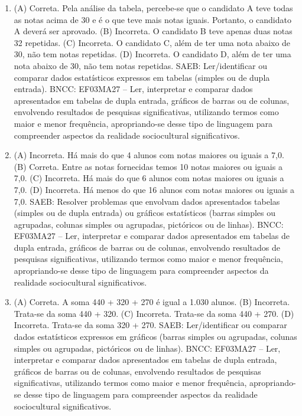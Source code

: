 \begin{enumerate}
\item
(A) Correta. Pela análise da tabela, percebe-se que o candidato A teve todas as notas
acima de 30 e é o que teve mais notas iguais. Portanto, o candidato A
deverá ser aprovado.
(B) Incorreta. O candidato B teve apenas duas notas 32 repetidas.
(C) Incorreta. O candidato C, além de ter uma nota abaixo de 30, não tem notas repetidas.
(D) Incorreta. O candidato D, além de ter uma nota abaixo de 30, não tem notas repetidas.
SAEB: Ler/identificar ou comparar dados estatísticos expressos em tabelas (simples ou de dupla entrada). 
BNCC: EF03MA27 -- Ler, interpretar e comparar dados apresentados em tabelas de dupla entrada,
gráficos de barras ou de colunas, envolvendo resultados de pesquisas significativas, utilizando
termos como maior e menor frequência, apropriando-se desse tipo de linguagem para
compreender aspectos da realidade sociocultural significativos.

\item
(A) Incorreta. Há mais do que 4 alunos com notas maiores ou iguais a 7,0.
(B) Correta. Entre as notas fornecidas temos 10 notas maiores ou iguais a 7,0.
(C) Incorreta. Há mais do que 6 alunos com notas maiores ou iguais a 7,0.
(D) Incorreta. Há menos do que 16 alunos com notas maiores ou iguais a 7,0.
SAEB: Resolver problemas que envolvam dados apresentados tabelas (simples ou de dupla entrada) ou gráficos estatísticos (barras simples ou agrupadas, colunas simples ou agrupadas, pictóricos ou de linhas). 
BNCC: EF03MA27 -- Ler, interpretar e comparar dados apresentados em tabelas de dupla entrada,
gráficos de barras ou de colunas, envolvendo resultados de pesquisas significativas, utilizando
termos como maior e menor frequência, apropriando-se desse tipo de linguagem para
compreender aspectos da realidade sociocultural significativos.

\item
(A) Correta.  A soma 440 + 320 + 270 é igual a 1.030 alunos.
(B) Incorreta. Trata-se da soma 440 + 320.
(C) Incorreta. Trata-se da soma 440 + 270.
(D) Incorreta. Trata-se da soma 320 + 270.
SAEB: Ler/identificar ou comparar dados estatísticos expressos em gráficos (barras simples ou agrupadas, colunas simples ou agrupadas, pictóricos ou de linhas). 
BNCC: EF03MA27 -- Ler, interpretar e comparar dados apresentados em tabelas de dupla entrada,
gráficos de barras ou de colunas, envolvendo resultados de pesquisas significativas, utilizando
termos como maior e menor frequência, apropriando-se desse tipo de linguagem para
compreender aspectos da realidade sociocultural significativos.
\end{enumerate}

